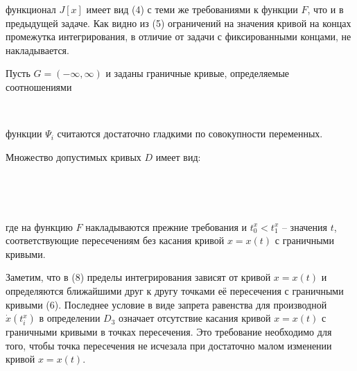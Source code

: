 функционал $J[x]$ имеет вид (4) с теми же требованиями к функции $F$, что и в предыдущей задаче. Как видно из (5) ограничений на значения кривой на концах промежутка интегрирования, в отличие от задачи с фиксированными концами, не накладывается.


Пусть $G = (-\infty, \infty)$ и заданы граничные кривые, определяемые соотношениями

\

функции $\Psi_i$ считаются достаточно гладкими по совокупности переменных.

Множество допустимых кривых $D$ имеет вид:


\


\

где на функцию $F$ накладываются прежние требования и $t^x_0 < t^x_1$ -- значения $t$, соответствующие пересечениям без касания кривой $x = x(t)$ с граничными кривыми.

Заметим, что в (8) пределы интегрирования зависят от кривой $x = x(t)$ и определяются ближайшими друг к другу точками её пересечения с граничными кривыми (6). Последнее условие в виде запрета равенства для производной $\dot{x}(t^x_i)$ в определении $D_3$ означает отсутствие касания кривой $x = x(t)$ с граничными кривыми в точках пересечения. Это требование необходимо для того, чтобы точка пересечения не исчезала при достаточно малом изменении кривой $x = x(t)$.




